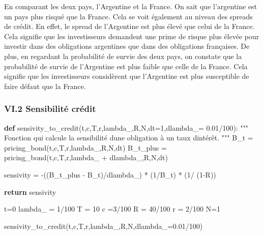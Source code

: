 \documentclass[
  letterpaper,
  DIV=11,
  numbers=noendperiod]{scrartcl}
\newenvironment{Shaded}{\begin{snugshade}}{\end{snugshade}}
\newcommand{\CommentTok}[1]{\textcolor[rgb]{0.37,0.37,0.37}{#1}}
\newcommand{\ControlFlowTok}[1]{\textcolor[rgb]{0.00,0.23,0.31}{\textbf{#1}}}
\newcommand{\DecValTok}[1]{\textcolor[rgb]{0.68,0.00,0.00}{#1}}
\newcommand{\FloatTok}[1]{\textcolor[rgb]{0.68,0.00,0.00}{#1}}
\newcommand{\KeywordTok}[1]{\textcolor[rgb]{0.00,0.23,0.31}{\textbf{#1}}}
\newcommand{\NormalTok}[1]{\textcolor[rgb]{0.00,0.23,0.31}{#1}}
\newcommand{\OperatorTok}[1]{\textcolor[rgb]{0.37,0.37,0.37}{#1}}
\begin{document}
En comparant les deux pays, l'Argentine et la France. On sait que
l'argentine est un pays plus risqué que la France. Cela se voit
également au niveau des spreads de crédit. En effet, le spread de
l'Argentine est plus élevé que celui de la France. Cela signifie que les
investisseurs demandent une prime de risque plus élevée pour investir
dans des obligations argentines que dans des obligations françaises. De
plus, en regardant la probabilité de survie des deux pays, on constate
que la probabilité de survie de l'Argentine est plus faible que celle de
la France. Cela signifie que les investisseurs considèrent que
l'Argentine est plus susceptible de faire défaut que la France.

\subsubsection{VI.2 Sensibilité
crédit}\label{vi.2-sensibilituxe9-cruxe9dit}

\begin{Shaded}
\begin{Highlighting}[]
\KeywordTok{def}\NormalTok{ sensivity\_to\_credit(t,c,T,r,lambda\_,R,N,dt}\OperatorTok{=}\DecValTok{1}\NormalTok{,dlambda\_}\OperatorTok{=} \FloatTok{0.01}\OperatorTok{/}\DecValTok{100}\NormalTok{):}
    \CommentTok{"""}
\CommentTok{    Fonction qui calcule la sensibilité d\textquotesingle{}une obligation à un taux d\textquotesingle{}intérêt.}
\CommentTok{    """}
\NormalTok{    B\_t }\OperatorTok{=}\NormalTok{ pricing\_bond(t,c,T,r,lambda\_,R,N,dt)}
\NormalTok{    B\_t\_plus }\OperatorTok{=}\NormalTok{ pricing\_bond(t,c,T,r,lambda\_ }\OperatorTok{+}\NormalTok{ dlambda\_,R,N,dt)}
    
\NormalTok{    sensivity }\OperatorTok{=} \OperatorTok{{-}}\NormalTok{((B\_t\_plus }\OperatorTok{{-}}\NormalTok{ B\_t)}\OperatorTok{/}\NormalTok{dlambda\_) }\OperatorTok{*}\NormalTok{ (}\DecValTok{1}\OperatorTok{/}\NormalTok{B\_t) }\OperatorTok{*}\NormalTok{ (}\DecValTok{1}\OperatorTok{/}\NormalTok{ (}\DecValTok{1}\OperatorTok{{-}}\NormalTok{R))}

    \ControlFlowTok{return}\NormalTok{ sensivity}
\end{Highlighting}
\end{Shaded}

\begin{Shaded}
\begin{Highlighting}[]
\NormalTok{t}\OperatorTok{=}\DecValTok{0}
\NormalTok{lambda\_ }\OperatorTok{=} \DecValTok{1}\OperatorTok{/}\DecValTok{100}
\NormalTok{T }\OperatorTok{=} \DecValTok{10}
\NormalTok{c }\OperatorTok{=}\DecValTok{3}\OperatorTok{/}\DecValTok{100}
\NormalTok{R }\OperatorTok{=} \DecValTok{40}\OperatorTok{/}\DecValTok{100}
\NormalTok{r }\OperatorTok{=} \DecValTok{2}\OperatorTok{/}\DecValTok{100}
\NormalTok{N}\OperatorTok{=}\DecValTok{1}

\NormalTok{sensivity\_to\_credit(t,c,T,r,lambda\_,R,N,dlambda\_}\OperatorTok{=}\FloatTok{0.01}\OperatorTok{/}\DecValTok{100}\NormalTok{)}
\end{Highlighting}
\end{Shaded}
\end{document}
